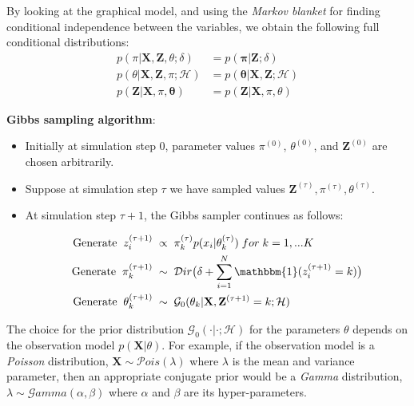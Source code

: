 By looking at the graphical model, and using the \emph{Markov blanket} for finding conditional independence between the variables, we obtain the following full conditional distributions:
\begin{equation}%
  \begin{aligned}
	p(\pi|\mathbf{X},\mathbf{Z},\theta;\delta) & = p(\mathbf{\pi} | \mathbf{Z};\delta) \\ 
	p(\theta|\mathbf{X},\mathbf{Z},\pi;\mathcal{H}) & = p(\mathbf{\theta}|\mathbf{X},\mathbf{Z};\mathcal{H})  \\
	p(\mathbf{Z}|\mathbf{X},\pi, \mathbf{\theta}) & = p(\mathbf{Z}|\mathbf{X},\pi, \theta)
  \end{aligned}
\end{equation}

\noindent\textbf{Gibbs sampling algorithm}: 
\begin{itemize}
\item {Initially at simulation step 0, parameter values $\pi^{(0)}$, $\theta^{(0)}$, and $\mathbf{Z}^{(0)}$ are chosen arbitrarily.}
\item {Suppose at simulation step $\tau$ we have sampled values $\mathbf{Z}^{(\tau)}, \pi^{(\tau)}, \theta^{(\tau)}$.}
\item { At simulation step $\tau + 1$, the Gibbs sampler continues as follows:

\begin{equation*}%
  \begin{aligned}
    \text{Generate} \; \; z_{i}^{(\tau+1)} \; & \propto \; \pi_{k}^{(\tau)}p(x_{i}|\theta_{k}^{(\tau)}) \; for \; k=1,...K \\
    \text{Generate} \; \; \pi_{k}^{(\tau+1)} \; & \sim \; \mathcal{D}ir\big(\delta + \sum_{i=1}^{N}\mathbbm{1}(z_{i}^{(\tau+1)}=k)\big) \\
    \text{Generate} \; \; \theta_{k}^{(\tau+1)} \; & \sim \; \mathcal{G}_{0}(\theta_{k}| \mathbf{X}, \mathbf{Z}^{(\tau+1)}=k; \mathcal{H})
  \end{aligned}
\end{equation*}
}
\end{itemize}

The choice for the prior distribution $\mathcal{G}_{0}(\cdot| \cdot; \mathcal{H})$ for the parameters $\theta$ depends on the observation model $p(\mathbf{X}|\theta)$. For example, if the observation model is a \emph{Poisson} distribution, \ie $\mathbf{X} \sim \mathcal{P}ois(\lambda)$ where $\lambda$ is the mean and variance parameter, then an appropriate conjugate prior would be a \emph{Gamma} distribution, \ie $\lambda \sim \mathcal{G}amma(\alpha, \beta)$ where $\alpha$ and $\beta$ are its hyper-parameters.